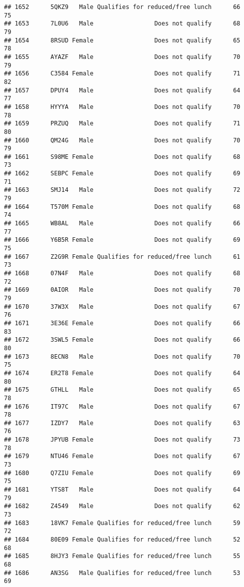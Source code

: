 \documentclass[
]{article}
\begin{document}
\begin{verbatim}
## 1652      5QKZ9   Male Qualifies for reduced/free lunch      66       75
## 1653      7L0U6   Male                 Does not qualify      68       79
## 1654      8RSUD Female                 Does not qualify      65       78
## 1655      AYAZF   Male                 Does not qualify      70       79
## 1656      C3584 Female                 Does not qualify      71       82
## 1657      DPUY4   Male                 Does not qualify      64       77
## 1658      HYYYA   Male                 Does not qualify      70       78
## 1659      PRZUQ   Male                 Does not qualify      71       80
## 1660      QM24G   Male                 Does not qualify      70       79
## 1661      S98ME Female                 Does not qualify      68       73
## 1662      SEBPC Female                 Does not qualify      69       71
## 1663      SMJ14   Male                 Does not qualify      72       79
## 1664      T570M Female                 Does not qualify      68       74
## 1665      WB8AL   Male                 Does not qualify      66       77
## 1666      Y6B5R Female                 Does not qualify      69       75
## 1667      Z2G9R Female Qualifies for reduced/free lunch      61       73
## 1668      07N4F   Male                 Does not qualify      68       72
## 1669      0AIOR   Male                 Does not qualify      70       79
## 1670      37W3X   Male                 Does not qualify      67       76
## 1671      3E36E Female                 Does not qualify      66       83
## 1672      3SWL5 Female                 Does not qualify      66       80
## 1673      8ECN8   Male                 Does not qualify      70       75
## 1674      ER2T8 Female                 Does not qualify      64       80
## 1675      GTHLL   Male                 Does not qualify      65       78
## 1676      IT97C   Male                 Does not qualify      67       78
## 1677      IZDY7   Male                 Does not qualify      63       76
## 1678      JPYUB Female                 Does not qualify      73       78
## 1679      NTU46 Female                 Does not qualify      67       73
## 1680      Q7ZIU Female                 Does not qualify      69       75
## 1681      YTS8T   Male                 Does not qualify      64       79
## 1682      Z4549   Male                 Does not qualify      62       73
## 1683      18VK7 Female Qualifies for reduced/free lunch      59       72
## 1684      80E09 Female Qualifies for reduced/free lunch      52       68
## 1685      8HJY3 Female Qualifies for reduced/free lunch      55       68
## 1686      AN3SG   Male Qualifies for reduced/free lunch      53       69

\end{verbatim}
\end{document}
